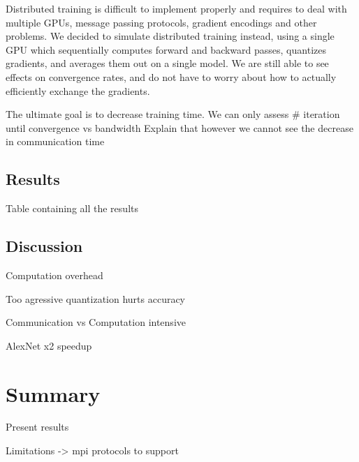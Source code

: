 \documentclass[10pt,conference,compsocconf]{IEEEtran}
\begin{document}
Distributed training is difficult to implement properly and requires to deal with multiple GPUs, message passing protocols, gradient encodings and other problems. We decided to simulate distributed training instead, using a single GPU which sequentially computes forward and backward passes, quantizes gradients, and averages them out on a single model. We are still able to see effects on convergence rates, and do not have to worry about how to actually efficiently exchange the gradients.

The ultimate goal is to decrease training time. We can only assess \# iteration until convergence vs bandwidth
Explain that however we cannot see the decrease in communication time

\subsection{Results}

Table containing all the results

\subsection{Discussion}

Computation overhead

Too agressive quantization hurts accuracy

Communication vs Computation intensive

AlexNet x2 speedup

\section{Summary}

Present results

Limitations -> mpi protocols to support
\end{document}
